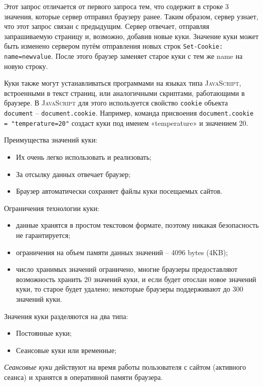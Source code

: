 \documentclass[a4paper,14pt,openany,final]{extreport} %
\begin{document}
Этот запрос отличается от первого запроса тем, что содержит в строке 3 значения, которые сервер отправил браузеру ранее. Таким образом, сервер узнает, что этот запрос связан с предыдущим. Сервер отвечает, отправляя запрашиваемую страницу и, возможно, добавив новые куки. Значение куки может быть изменено сервером путём отправления новых строк \verb|Set-Cookie: name=newvalue|. После этого браузер заменяет старое куки с тем же name на новую строку.

Куки также могут устанавливаться программами на языках типа \textsc{JavaScript}, встроенными в текст страниц, или аналогичными скриптами, работающими в браузере. В \textsc{JavaScript} для этого используется свойство \verb|cookie| объекта \verb|document| -- \verb|document.cookie|. Например, команда присвоения \verb|document.cookie = "temperature=20"| создаст куки под именем «temperature» и значением 20.

Преимущества значений куки:
\begin{itemize}
\item Их очень легко использовать и реализовать;
\item За отсылку данных отвечает браузер;
\item Браузер автоматически сохраняет файлы куки посещаемых сайтов.
\end{itemize}
Ограничения технологии куки:
\begin{itemize}
\item данные хранятся в простом текстовом формате, поэтому никакая
  безопасность не гарантируется;
\item ограничения на объем
  памяти данных значений --  4096 bytes (4KB);
\item число хранимых значений ограничено, многие браузеры предоставляют возможность хранить 20
  значений куки, и если будет отослан новое значений куки, то старое будет
  удалено; некоторые браузеры поддерживают до 300 значений куки.
\end{itemize}


Значения куки разделяются на два типа:
\begin{itemize}
\item Постоянные куки;
\item Сеансовые куки или временные;
\end{itemize}

\emph{Сеансовые куки} действуют на время работы пользователя с сайтом (активного сеанса) и хранятся в оперативной памяти браузера. %
\end{document}
